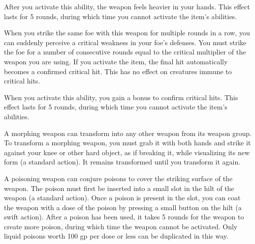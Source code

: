 After you activate this ability, the weapon feels heavier in your hands. This effect lasts for 5 rounds, during which time you cannot activate the item's abilities.


 When you strike the same foe with this weapon for multiple rounds in a row, you can suddenly perceive a critical weakness in your foe's defenses. You must strike the foe for a number of consecutive rounds equal to the critical multiplier of the weapon you are using. If you activate the item, the final hit automatically becomes a confirmed critical hit. This has no effect on creatures immune to critical hits.

When you activate this ability, you gain a  bonus to confirm critical hits. This effect lasts for 5 rounds, during which time you cannot activate the item's abilities.


 A morphing weapon can transform into any other weapon from its weapon group. To transform a morphing weapon, you must grab it with both hands and strike it against your knee or other hard object, as if breaking it, while visualizing its new form (a standard action). It remains transformed until you transform it again.


 A poisoning weapon can conjure poisons to cover the striking surface of the weapon. The poison must first be inserted into a small slot in the hilt of the weapon (a standard action). Once a poison is present in the slot, you can coat the weapon with a dose of the poison by pressing a small button on the hilt (a swift action). After a poison has been used, it takes 5 rounds for the weapon to create more poison, during which time the weapon cannot be activated. Only liquid poisons worth 100 gp per dose or less can be duplicated in this way.

